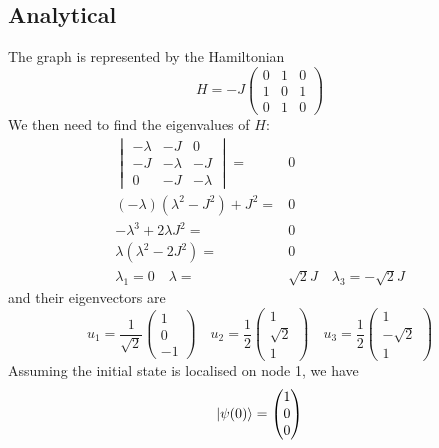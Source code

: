 \documentclass[aps]{revtex4-2}
\DeclarePairedDelimiter\ket{\lvert}{\rangle}
\begin{document}
\subsection{Analytical}
\noindent The graph is represented by the Hamiltonian
\begin{equation}
    H=-J\begin{pmatrix}
        0&1&0\\
        1&0&1\\
        0&1&0
    \end{pmatrix}
\end{equation}
We then need to find the eigenvalues of $H$:
\begin{align}
    \begin{vmatrix}
        -\lambda&-J&0\\
        -J&-\lambda&-J\\
        0&-J&-\lambda
    \end{vmatrix}=&0\nonumber\\
    (-\lambda)(\lambda^2-J^2)+J^2=&0\nonumber\\
    -\lambda^3+2\lambda J^2=&0\nonumber\\
    \lambda(\lambda^2-2J^2)=&0\nonumber\\
    \lambda_1=0\quad\lambda=&\sqrt{2}J\quad\lambda_3=-\sqrt{2}J
\end{align}
and their eigenvectors are
\begin{equation}
    u_1=\frac{1}{\sqrt{2}}\begin{pmatrix}
        1\\
        0\\
        -1
    \end{pmatrix}\quad u_2=\frac{1}{2}\begin{pmatrix}
        1\\
        \sqrt{2}\\
        1
    \end{pmatrix}\quad u_3=\frac{1}{2}\begin{pmatrix}
        1\\
        -\sqrt{2}\\
        1
    \end{pmatrix}
\end{equation}
Assuming the initial state is localised on node 1, we have
\begin{equation}
    \ket{\psi(0)}=\begin{pmatrix}
        1\\
        0\\
        0
    \end{pmatrix}
\end{equation}
\end{document}
